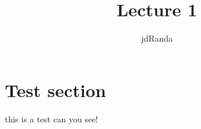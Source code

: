 \documentclass[10pt]{article}
\author{jdRanda}
\title{Lecture 1}
\begin{document}
    \section{Test section}
        this is a test can you see!
\end{document}
